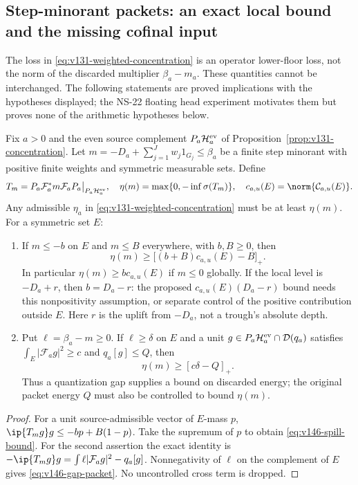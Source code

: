 \subsection*{Step-minorant packets: an exact local bound and the missing cofinal input}

The loss in \eqref{eq:v131-weighted-concentration} is an operator
lower-floor loss, not the norm of the discarded multiplier
$\beta_a-m_a$. These quantities cannot be interchanged. The following
statements are proved implications with the hypotheses displayed;
the NS-22 floating head experiment motivates them but proves none of
the arithmetic hypotheses below.

\begin{proposition}
\label{prop:v146-packet-loss}
Fix $a>0$ and the even source complement
$P_a\mathcal H_a^{\rm ev}$ of Proposition~\ref{prop:v131-concentration}.
Let $m=-D_a+\sum_{j=1}^Jw_j1_{G_j}\le\beta_a$ be a finite step
minorant with positive finite weights and symmetric measurable sets.
Define
\[
 T_m=P_a\mathcal F_a^*m\mathcal F_aP_a\big|_{P_a\mathcal H_a^{\rm ev}},
 \quad \eta(m)=\max\{0,-\inf\sigma(T_m)\},\quad
 c_{a,u}(E)=\norm{\mathcal C_{a,u}(E)}.
\]
Any admissible $\eta_a$ in \eqref{eq:v131-weighted-concentration}
must be at least $\eta(m)$. For a symmetric set $E$:
\begin{enumerate}
\item If $m\le-b$ on $E$ and $m\le B$ everywhere, with $b,B\ge0$, then
\begin{equation}\label{eq:v146-spill-bound}
 \eta(m)\ge\bigl[(b+B)c_{a,u}(E)-B\bigr]_+.
\end{equation}
In particular $\eta(m)\ge b c_{a,u}(E)$ if $m\le0$ globally.
If the local level is $-D_a+r$, then $b=D_a-r$: the proposed
$c_{a,u}(E)(D_a-r)$ bound needs this nonpositivity assumption, or
separate control of the positive contribution outside $E$. Here $r$
is the uplift from $-D_a$, not a trough's absolute depth.
\item Put $\ell=\beta_a-m\ge0$. If $\ell\ge\delta$ on $E$ and a
unit $g\in P_a\mathcal H_a^{\rm ev}\cap\mathcal D(q_a)$ satisfies
$\int_E|\mathcal F_ag|^2\ge c$ and $q_a[g]\le Q$, then
\begin{equation}\label{eq:v146-gap-packet}
 \eta(m)\ge[c\delta-Q]_+.
\end{equation}
Thus a quantization gap supplies a bound on discarded energy; the
original packet energy $Q$ must also be controlled to bound $\eta(m)$.
\end{enumerate}
\end{proposition}
\begin{proof}
For a unit source-admissible vector of $E$-mass $p$,
$\ip{T_mg}g\le-bp+B(1-p)$. Take the supremum of $p$ to obtain
\eqref{eq:v146-spill-bound}. For the second assertion the exact identity
is $-\ip{T_mg}g=\int\ell|\mathcal F_ag|^2-q_a[g]$.
Nonnegativity of $\ell$ on the complement of $E$ gives
\eqref{eq:v146-gap-packet}. No uncontrolled cross term is dropped.
\end{proof}

